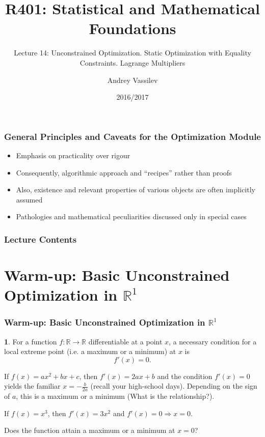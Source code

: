 \documentclass[10pt]{beamer}
\title{R401: Statistical and Mathematical Foundations}
\subtitle{Lecture 14: Unconstrained Optimization. Static Optimization with Equality Constraints. Lagrange Multipliers}
\author{Andrey Vassilev}
\date{2016/2017}
\theoremstyle{definition}
\newtheorem{Fact}{\translate{Fact}}
\begin{document}
\maketitle

\begin{frame}[fragile]
\frametitle{General Principles and Caveats for the Optimization Module}
\begin{itemize}
\item Emphasis on practicality over rigour
\item Consequently, algorithmic approach and ``recipes'' rather than proofs
\item Also, existence and relevant properties of various objects are often implicitly assumed
\item Pathologies and mathematical peculiarities discussed only in special cases
\end{itemize}
\end{frame}

\begin{frame}[fragile]
\frametitle{Lecture Contents}
\tableofcontents
\end{frame}




\section{Warm-up: Basic Unconstrained Optimization in $ \mathbb{R}^1 $}\label{sec:R1}

\begin{frame}[fragile]
\frametitle{Warm-up: Basic Unconstrained Optimization in $ \mathbb{R}^1 $}

\begin{Fact}
For a function $ f: \mathbb{R} \rightarrow \mathbb{R} $ differentiable at a point $ x $, a necessary condition for a local extreme point (i.e. a maximum or a minimum) at $ x $ is \[ f'(x) = 0. \]
\end{Fact}
\bigskip

\begin{example} %
If $ f(x) = ax^2 + bx + c $, then $ f'(x) = 2ax + b $ and the condition $ f'(x)=0 $ yields the familiar $ x=-\frac{b}{2a} $ (recall your high-school days). Depending on the sign of $ a $, this is a maximum or a minimum (What is the relationship?).
\end{example}\bigskip

\begin{example} %
If $ f(x) = x^3 $, then $ f'(x)=3x^2 $ and $ f'(x)=0 \Rightarrow x=0$.

Does the function attain a maximum or a minimum at $ x=0 $?
\end{example}
\end{frame}
\end{document}
